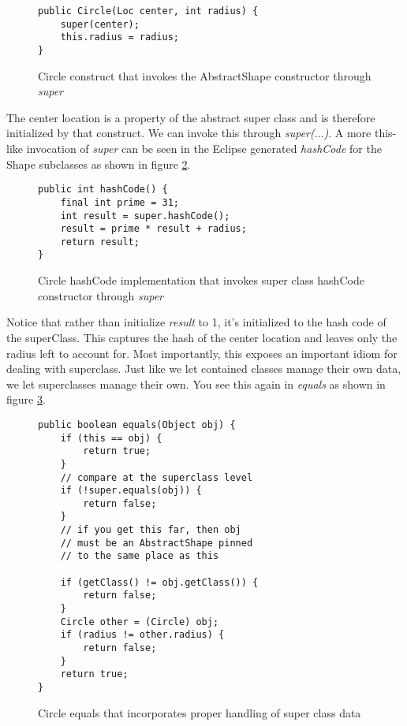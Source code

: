 \documentclass[]{tufte-handout}
\begin{document}
\begin{figure}[!ht]
\begin{lstlisting}
public Circle(Loc center, int radius) {
	super(center);		
	this.radius = radius;
}
\end{lstlisting}
\label{fig:circctor}
\caption{Circle construct that invokes the AbstractShape constructor through \textit{super}}
\end{figure}

The center location is a property of the abstract super class and is therefore initialized by that construct. We can invoke this through \textit{super($\ldots$)}. A more this-like invocation of \textit{super} can be seen in the Eclipse generated \textit{hashCode} for the Shape subclasses as shown in figure \ref{fig:circhash}.


\begin{figure}[!ht]
\begin{lstlisting}
public int hashCode() {
	final int prime = 31;
	int result = super.hashCode();
	result = prime * result + radius;
	return result;
}
\end{lstlisting}
\label{fig:circhash}
\caption{Circle hashCode implementation that invokes super class hashCode constructor through \textit{super}}
\end{figure}

Notice that rather than initialize \textit{result} to 1, it's initialized to the hash code of the superClass. This captures the hash of the center location and leaves only the radius left to account for. Most importantly, this exposes an important idiom for dealing with superclass. Just like we let contained classes manage their own data, we let superclasses manage their own. You see this again in \textit{equals} as shown in figure \ref{fig:circeq}.

\begin{figure}[!ht]
\begin{lstlisting}
public boolean equals(Object obj) {
	if (this == obj) {
		return true;
	}
	// compare at the superclass level
	if (!super.equals(obj)) {
		return false;
	}
	// if you get this far, then obj
	// must be an AbstractShape pinned
	// to the same place as this
	
	if (getClass() != obj.getClass()) {
		return false;
	}
	Circle other = (Circle) obj;
	if (radius != other.radius) {
		return false;
	}
	return true;
}
\end{lstlisting}
\label{fig:circeq}
\caption{Circle equals that incorporates proper handling of super class data}
\end{figure}
\end{document}
